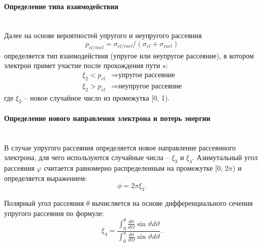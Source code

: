 \paragraph{Определение типа взаимодействия} \mbox{} \\
\indent Далее на основе вероятностей упругого и неупругого рассеяния
\begin{equation} \label{eq:MC_8}
	p_{el/inel}=\sigma_{el/inel} /\left(\sigma_{el}+\sigma_{inel} \right)
\end{equation}
определяется тип взаимодействия (упругое или неупругое рассеяние), в котором электрон примет участие после прохождения пути $s$:
\begin{equation} \label{eq:MC_9}
	\begin{aligned}
		\xi_2 < p_{el} & \Rightarrow \text{упругое рассеяние} \\
		\xi_2 > p_{el} & \Rightarrow \text{неупругое рассеяние}
	\end{aligned}
\end{equation}
где $\xi_2$ -- новое случайное число из промежутка [0, 1).


\paragraph{Определение нового направления электрона и потерь энергии} \mbox{} \\
\indent В случае упругого рассеяния определяется новое направление рассеянного электрона, для чего используются случайные числа -- $\xi_3$ и $\xi_4$. Азимутальный угол рассеяния $\varphi$ считается равномерно распределенным на промежутке [0, 2$\pi$) и определяется выражением:
\begin{equation} \label{eq:MC_11}
	\phi = 2 \pi \xi_3.
\end{equation}

Полярный угол рассеяния $\theta$ вычисляется на основе дифференциального сечения упругого рассеяния по формуле:
\begin{equation} \label{eq:MC_12}
	\xi_4 = \frac
	{\displaystyle \int_0^\theta \frac{d \sigma}{d \Omega} \sin \vartheta d \vartheta}
	{\displaystyle \int_0^\pi \frac{d \sigma}{d \Omega} \sin \vartheta d \vartheta}.
\end{equation}

